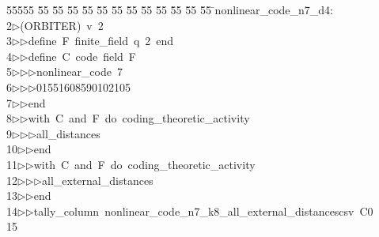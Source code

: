 %
%
\begin{tabbing}
55555 \= 55 \= 55 \= 55 \= 55 \= 55 \= 55 \= 55 \= 55 \= 55 \= 55 \= 55 \= 55 \= \>nonlinear\_code\_n7\_d4:\\[0pt]
2\>$\triangleright$\>(ORBITER)\ v\ 2\ \\[0pt]
3\>$\triangleright$\>$\triangleright$\>define\ F\ finite\_field\ q\ 2\ end\ \\[0pt]
4\>$\triangleright$\>$\triangleright$\>define\ C\ code\ field\ F\ \\[0pt]
5\>$\triangleright$\>$\triangleright$\>$\triangleright$\>nonlinear\_code\ 7\ \\[0pt]
6\>$\triangleright$\>$\triangleright$\>$\triangleright$\>01551608590102105\ \\[0pt]
7\>$\triangleright$\>$\triangleright$\>end\ \\[0pt]
8\>$\triangleright$\>$\triangleright$\>with\ C\ and\ F\ do\ coding\_theoretic\_activity\ \\[0pt]
9\>$\triangleright$\>$\triangleright$\>$\triangleright$\>all\_distances\ \\[0pt]
10\>$\triangleright$\>$\triangleright$\>end\ \\[0pt]
11\>$\triangleright$\>$\triangleright$\>with\ C\ and\ F\ do\ coding\_theoretic\_activity\ \\[0pt]
12\>$\triangleright$\>$\triangleright$\>$\triangleright$\>all\_external\_distances\ \\[0pt]
13\>$\triangleright$\>$\triangleright$\>end\ \\[0pt]
14\>$\triangleright$\>$\triangleright$\>tally\_column\ nonlinear\_code\_n7\_k8\_all\_external\_distancescsv\ C0\\[0pt]
15\>\end{tabbing}
